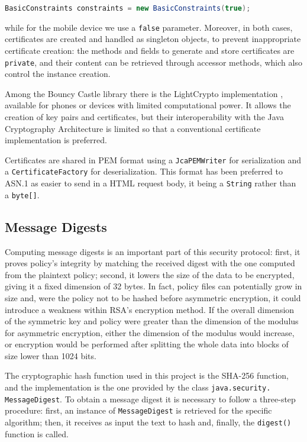 \lstinline[language=java]!BasicConstraints constraints = new BasicConstraints(true);!

while for the mobile device we use a \texttt{false} parameter. Moreover, in both cases, certificates are created and handled as singleton objects, to prevent inappropriate certificate creation: the methods and fields to generate and store certificates are \texttt{private}, and their content can be retrieved through accessor methods, which also control the instance creation.

Among the Bouncy Castle library there is the LightCrypto implementation \cite{LightCrypto}, available for phones or devices with limited computational power. It allows the creation of key pairs and certificates, but their interoperability with the Java Cryptography Architecture is limited so that a conventional certificate implementation is preferred. 

Certificates are shared in PEM format using a \texttt{JcaPEMWriter} for serialization and a \texttt{CertificateFactory} for deserialization. This format has been preferred to ASN.1 as easier to send in a HTML request body, it being a \texttt{String} rather than a \texttt{byte[]}.

\subsection{Message Digests}
Computing message digests is an important part of this security protocol: first, it proves policy's integrity by matching the received digest with the one computed from the plaintext policy; second, it lowers the size of the data to be encrypted, giving it a fixed dimension of 32 bytes. In fact, policy files can potentially grow in size and, were the policy not to be hashed before asymmetric encryption, it could introduce a weakness within RSA's encryption method. If the overall dimension of the symmetric key and policy were greater than the dimension of the modulus for asymmetric encryption, either the dimension of the modulus would increase, or encryption would be performed after splitting the whole data into blocks of size lower than 1024 bits.

The cryptographic hash function used in this project is the SHA-256 function, and the implementation is the one provided by the class \texttt{java.security. MessageDigest}. To obtain a message digest it is necessary to follow a three-step procedure: first, an instance of \texttt{MessageDigest} is retrieved for the specific algorithm; then, it receives as input the text to hash and, finally, the \texttt{digest()} function is called.

